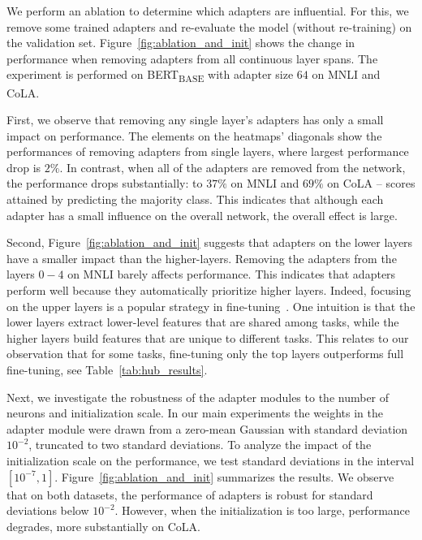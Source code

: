 We perform an ablation to determine which adapters are influential.
For this, we remove some trained adapters and re-evaluate the model (without re-training) on the validation set.
Figure~\ref{fig:ablation_and_init} shows the change in performance when removing adapters from all continuous layer spans.
The experiment is performed on BERT\textsubscript{BASE} with adapter size $64$ on MNLI and CoLA.

First, we observe that removing any single layer's adapters has only a small impact on performance.
The elements on the heatmaps' diagonals show the performances of removing adapters from single layers, where largest performance drop is $2\%$.
In contrast, when all of the adapters are removed from the network,
the performance drops substantially:
to $37\%$ on MNLI and $69\%$ on CoLA -- scores attained by predicting the majority class.
This indicates that although each adapter has a small influence on the overall network, the overall effect is large.

Second, Figure~\ref{fig:ablation_and_init} suggests that adapters on the lower layers have a smaller impact than the higher-layers.
Removing the adapters from the layers $0-4$ on MNLI barely affects performance.
This indicates that adapters perform well because they automatically prioritize higher layers.
Indeed, focusing on the upper layers is a popular strategy in fine-tuning~\citep{howard2018universal}.
One intuition is that the lower layers extract lower-level features that are shared among tasks, while the
higher layers build features that are unique to different tasks.
This relates to our observation that for some tasks, fine-tuning only the top layers outperforms full fine-tuning, see Table~\ref{tab:hub_results}.

Next, we investigate the robustness of the adapter modules to the number of neurons and initialization scale.
In our main experiments the weights in the adapter module were drawn from
a zero-mean Gaussian with standard deviation $10^{-2}$, truncated to two standard deviations.
To analyze the impact of the initialization scale on the performance, we test standard deviations in the interval $[10^{-7},1]$.
Figure~\ref{fig:ablation_and_init} summarizes the results.
We observe that on both datasets, the performance of adapters is robust for standard deviations below $10^{-2}$.
However, when the initialization is too large, performance degrades, more substantially on CoLA.


